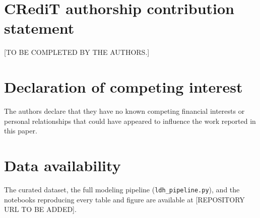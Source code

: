 \documentclass[review,12pt,authoryear]{elsarticle}
\begin{document}





\section*{CRediT authorship contribution statement}
[TO BE COMPLETED BY THE AUTHORS.]

\section*{Declaration of competing interest}
The authors declare that they have no known competing financial interests
or personal relationships that could have appeared to influence the work
reported in this paper.

\section*{Data availability}
The curated dataset, the full modeling pipeline
(\texttt{ldh\_pipeline.py}), and the notebooks reproducing every table and
figure are available at [REPOSITORY URL TO BE ADDED].



\end{document}
